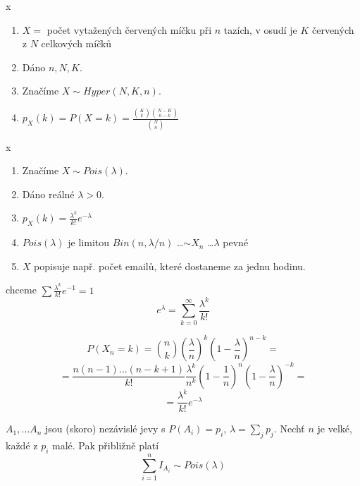 \documentclass[../main.tex]{subfiles}
\begin{document}
\begin{definition} {\color{white} x}
    \begin{enumerate}
        \item $X = $ počet vytažených červených míčku při $n$ tazích, v osudí je 
        $K$ červených z $N$ celkových míčků
        \item Dáno $n,N,K$.
        \item Značíme $X \sim Hyper(N,K,n)$.
        \item $p_X(k) = P(X = k) = \frac{\binom{K}{k}\binom{N-K}{n-k}}{\binom{N}{n}}$
    \end{enumerate}
\end{definition}

\begin{definition} {\color{white} x}

    \begin{enumerate}
        \item Značíme $X \sim Pois(\lambda)$.
        \item Dáno reálné $\lambda > 0$.
        \item $p_X(k) = \frac{\lambda^k}{k!}e^{-\lambda}$
        \item $Pois(\lambda)$ je limitou $Bin(n,\lambda/n)$ \dots $\sim X_n$ \dots $\lambda$ pevné
        \item $X$ popisuje např. počet emailů, které dostaneme za jednu hodinu.
    \end{enumerate}

    chceme $\sum \frac{\lambda^k}{k!}e^{-1} = 1$
    \[e^\lambda =  \sum^\infty_{k=0} \frac{\lambda^k}{k!}\]

    \[P(X_n = k) = \binom{n}{k}\left(\frac{\lambda}{n}\right)^k\left(1-\frac{\lambda}{n}\right)^{n-k} =\]
    \[=\frac{n(n-1)\dots (n-k+1)}{k!} \frac{\lambda^k}{n^k} \left(1-\frac{1}{n}\right)^n \left(1-\frac{\lambda}{n}\right)^{-k}=\]
    \[ = \frac{\lambda^k}{k!}e^{-\lambda}\]
\end{definition}

\begin{remark}

    $A_1,\dots A_n$ jsou (skoro) nezávislé jevy s $P(A_i) = p_i$,
    $\lambda = \sum_j p_j$. Nechť $n$ je velké, každé z $p_i$ malé. Pak přibližně platí
    \[\sum^n_{i=1}I_{A_i} \sim Pois(\lambda)\]
\end{remark}
\end{document}
